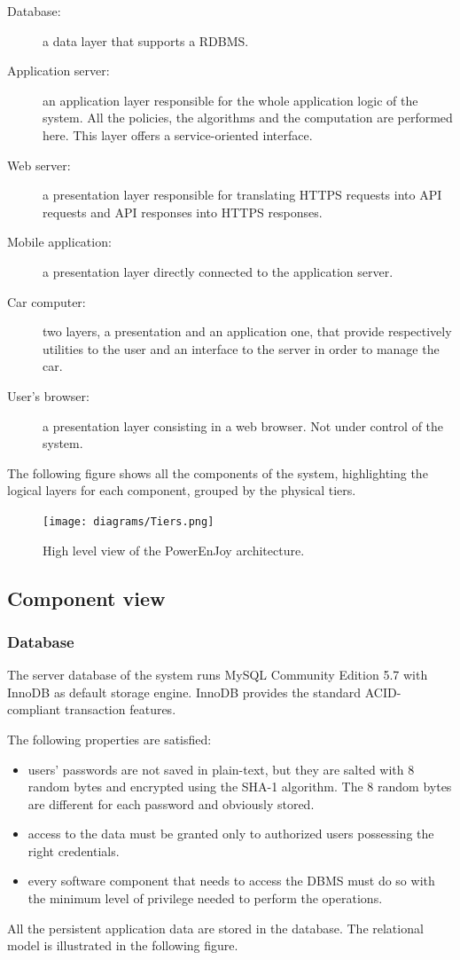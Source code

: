 \begin{description}
	\item[Database:] a data layer that supports a RDBMS.
	\item[Application server:] an application layer responsible for the whole application logic of the system. All the policies, the algorithms and the computation are performed here. This layer offers a service-oriented interface.
	\item[Web server:] a presentation layer responsible for translating HTTPS requests into API requests and API responses into HTTPS responses. 
	\item[Mobile application:] a presentation layer directly connected to the application server.
	\item[Car computer:] two layers, a presentation and an application one, that provide respectively utilities to the user and an interface to the server in order to manage the car.
	\item[User's browser:] a presentation layer consisting in a web browser. Not under control of the system.
\end{description}
The following figure shows all the components of the system, highlighting the logical layers for each component, grouped by the physical tiers.

\begin{figure}[H]
	\centering
	\texttt{[image: diagrams/Tiers.png]}
	\caption{High level view of the PowerEnJoy architecture.}
	\label {fig:tiers}
\end{figure}

\subsection{Component view}

\subsubsection{Database}

The server database of the system runs MySQL Community Edition 5.7 with InnoDB as default storage engine. InnoDB provides the standard ACID-compliant transaction features.

The following properties are satisfied:
\begin{itemize}
	\item users' passwords are not saved in plain-text, but they are salted with 8 random bytes and encrypted using the SHA-1 algorithm. The 8 random bytes are different for each password and obviously stored.
	\item access to the data must be granted only to authorized users possessing the right credentials.
	\item every software component that needs to access the DBMS must do so with the minimum level of privilege needed to perform the operations.
\end{itemize}
All the persistent application data are stored in the database. The relational model is illustrated in the following figure.

